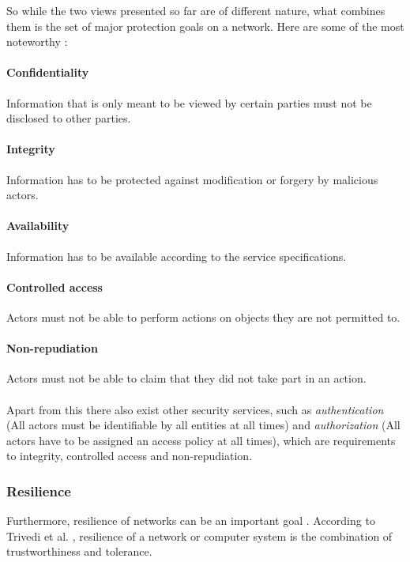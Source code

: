 So while the two views presented so far are of different nature, what combines them is the set of major protection goals on a network. Here are some of the most noteworthy \cite{goals}:
\paragraph{Confidentiality} Information that is only meant to be viewed by certain parties must not be disclosed to other parties.
\paragraph{Integrity} Information has to be protected against modification or forgery by malicious actors.
\paragraph{Availability} Information has to be available according to the service specifications.
\paragraph{Controlled access} Actors must not be able to perform actions on objects they are not permitted to.
\paragraph{Non-repudiation} Actors must not be able to claim that they did not take part in an action.


\paragraph{} Apart from this there also exist other security services, such as \textit{authentication} (All actors must be identifiable by all entities at all times) and \textit{authorization} (All actors have to be assigned an access policy at all times), which are requirements to integrity, controlled access and non-repudiation.


\subsubsection{Resilience}
Furthermore, resilience of networks can be an important goal \cite{resilience}. According to Trivedi et al. \cite{resilience}, resilience of a network or computer system is the combination of trustworthiness and tolerance.

